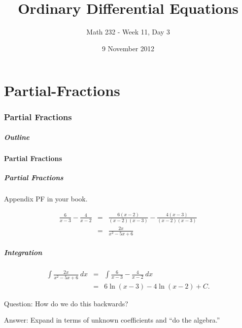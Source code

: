 \part{Partial-Fractions}
\section{Partial Fractions}


\title{Ordinary Differential Equations}
\subtitle{Math 232 - Week 11, Day 3}
\date{9 November 2012}

\begin{frame}
  \titlepage
\end{frame}

\begin{frame}
  \frametitle{Outline}
\end{frame}


\subsection{Partial Fractions}


\begin{frame}
  \frametitle{Partial Fractions}

  Appendix PF in your book.

  {
    \begin{eqnarray*}
      \frac{6}{x-3} - \frac{4}{x-2} & = & \frac{6(x-2)}{(x-2)(x-3)} - \frac{4(x-3)}{(x-2)(x-3)}\\
      & = & \frac{2x}{x^2-5x+6}
    \end{eqnarray*}
  }

\end{frame}


\begin{frame}
  \frametitle{Integration}

  \begin{eqnarray*}
    \int \frac{2x}{x^2-5x+6} ~ dx & = & \int \frac{6}{x-3} - \frac{4}{x-2} ~ dx \\
    & = & 6\ln(x-3) - 4\ln(x-2) + C.
  \end{eqnarray*}

  {
    Question: How do we do this backwards?

    Answer: Expand in terms of unknown coefficients and ``do the algebra.''
  }

\end{frame}


